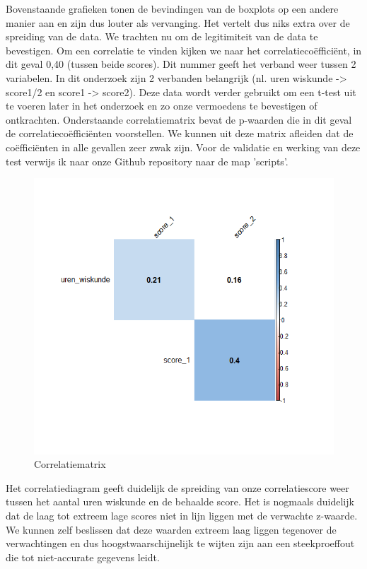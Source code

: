 \documentclass{hogent-article}
\begin{document}
	Bovenstaande grafieken tonen de bevindingen van de boxplots op een andere manier aan en zijn dus louter als vervanging. Het vertelt dus niks extra over de spreiding van de data.
	We trachten nu om de legitimiteit van de data te bevestigen. Om een correlatie te vinden kijken we naar het correlatiecoëfficiënt, in dit geval 0,40 (tussen beide scores). Dit nummer geeft het verband weer tussen 2 variabelen. In dit onderzoek zijn 2 verbanden belangrijk (nl. uren wiskunde -> score1/2 en score1 -> score2). Deze data wordt verder gebruikt om een t-test uit te voeren later in het onderzoek en zo onze vermoedens te bevestigen of ontkrachten. Onderstaande correlatiematrix bevat de p-waarden die in dit geval de correlatiecoëfficiënten voorstellen. We kunnen uit deze matrix afleiden dat de coëfficiënten in alle gevallen zeer zwak zijn. Voor de validatie en werking van deze test verwijs ik naar onze Github repository naar de map 'scripts'. \autocite{Decorte2019}
	\begin{figure}[H]
		\includegraphics[width=\linewidth]{img/corr.png}
		\caption{Correlatiematrix}
	\end{figure}
	
	Het correlatiediagram geeft duidelijk de spreiding van onze correlatiescore weer tussen het aantal uren wiskunde en de behaalde score. Het is nogmaals duidelijk dat de laag tot extreem lage scores niet in lijn liggen met de verwachte z-waarde. We kunnen zelf beslissen dat deze waarden extreem laag liggen tegenover de verwachtingen en dus hoogstwaarschijnelijk te wijten zijn aan een steekproeffout die tot niet-accurate gegevens leidt.
	
\end{document}
